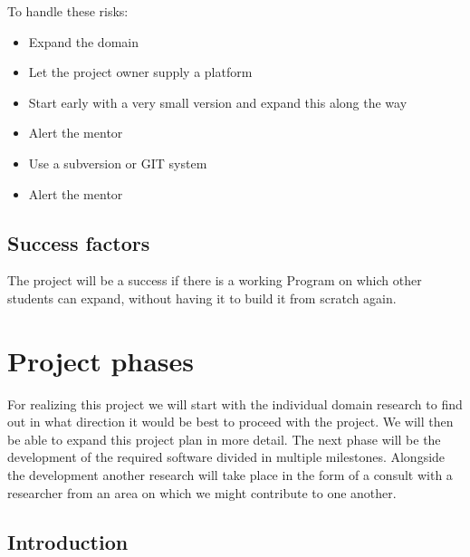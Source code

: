 \documentclass{article}
\begin{document}
\noindent To handle these risks:
\begin{itemize}
  \item Expand the domain
  \item Let the project owner supply a platform
  \item Start early with a very small version and expand this along the way
  \item Alert the mentor
  \item Use a subversion or GIT system
  \item Alert the mentor
\end{itemize}

\subsection{Success factors}

The project will be a success if there is a working Program on which other students can expand, without having it to build it from scratch again.

\section{Project phases}


For realizing this project we will start with the individual domain research to find out in what direction it would be best to proceed with the project. We will then be able to expand this project plan in more detail. The next phase will be the development of the required software divided in multiple milestones. Alongside the development another research will take place in the form of a consult with a researcher from an area on which we might contribute to one another.

\subsection{Introduction}

\end{document}
